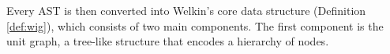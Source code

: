 Every AST is then converted into Welkin's core data structure (Definition \ref{def:wig}), which consists of two main components. The first component is the unit graph, a tree-like structure that encodes a hierarchy of nodes.



